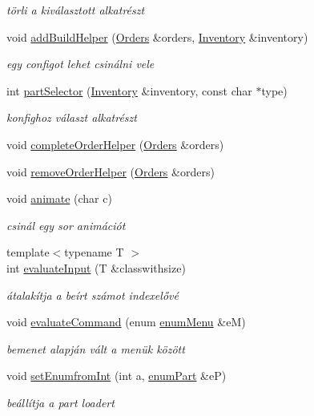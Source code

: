 \begin{DoxyCompactItemize}
\begin{DoxyCompactList}\small\item\em törli a kiválasztott alkatrészt \end{DoxyCompactList}\item 
void \mbox{\hyperlink{_menu_8cpp_a185a985b9e28ccd13d5fb2d841e4a5f0}{add\+Build\+Helper}} (\mbox{\hyperlink{class_orders}{Orders}} \&orders, \mbox{\hyperlink{class_inventory}{Inventory}} \&inventory)
\begin{DoxyCompactList}\small\item\em egy configot lehet csinálni vele \end{DoxyCompactList}\item 
int \mbox{\hyperlink{_menu_8cpp_aa66bedcbb6a6b03cde60b3441e6ae031}{part\+Selector}} (\mbox{\hyperlink{class_inventory}{Inventory}} \&inventory, const char $\ast$type)
\begin{DoxyCompactList}\small\item\em konfighoz választ alkatrészt \end{DoxyCompactList}\item 
void \mbox{\hyperlink{_menu_8cpp_a0f808ec53d26f8bcef1a0f22783c78f8}{complete\+Order\+Helper}} (\mbox{\hyperlink{class_orders}{Orders}} \&orders)
\item 
void \mbox{\hyperlink{_menu_8cpp_aed744d8c7e74c041565714ecfb656f0b}{remove\+Order\+Helper}} (\mbox{\hyperlink{class_orders}{Orders}} \&orders)
\item 
void \mbox{\hyperlink{_menu_8cpp_a9752b4d9f8a092734d3a8ea49b63c42b}{animate}} (char c)
\begin{DoxyCompactList}\small\item\em csinál egy sor animációt \end{DoxyCompactList}\item 
{\footnotesize template$<$typename T $>$ }\\int \mbox{\hyperlink{_menu_8cpp_a7618dfe88319843fa7ec62da27b1a007}{evaluate\+Input}} (T \&classwithsize)
\begin{DoxyCompactList}\small\item\em átalakítja a beírt számot indexelővé \end{DoxyCompactList}\item 
void \mbox{\hyperlink{_menu_8cpp_af4bf55c7933ba857c5d67526038aed45}{evaluate\+Command}} (enum \mbox{\hyperlink{_menu_8h_adbc27074b7dcd54cd4578936c6329d02}{enum\+Menu}} \&eM)
\begin{DoxyCompactList}\small\item\em bemenet alapján vált a menük között \end{DoxyCompactList}\item 
void \mbox{\hyperlink{_menu_8cpp_a4b1c8fae94d189d0d74b10cde7b75176}{set\+Enumfrom\+Int}} (int a, \mbox{\hyperlink{_parts_8h_abddff37837f171d72a2e16a1448a3943}{enum\+Part}} \&eP)
\begin{DoxyCompactList}\small\item\em beállítja a part loadert \end{DoxyCompactList}\end{DoxyCompactItemize}



